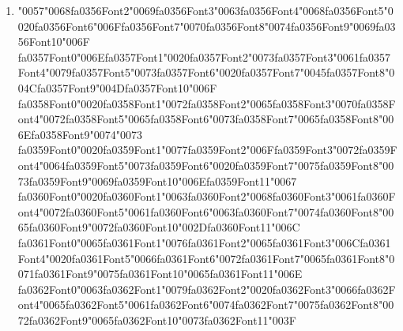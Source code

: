 \documentclass[12pt]{article}
\begin{document}
\begin{enumerate}[label=Q\arabic*.]
 \item {\char"0057}{\char"0068}{\csname fa0356Font2\endcsname\char"0069}{\csname fa0356Font3\endcsname\char"0063}{\csname fa0356Font4\endcsname\char"0068}{\csname fa0356Font5\endcsname\char"0020}{\csname fa0356Font6\endcsname\char"006F}{\csname fa0356Font7\endcsname\char"0070}{\csname fa0356Font8\endcsname\char"0074}{\csname fa0356Font9\endcsname\char"0069}{\csname fa0356Font10\endcsname\char"006F} {\csname fa0357Font0\endcsname\char"006E}{\csname fa0357Font1\endcsname\char"0020}{\csname fa0357Font2\endcsname\char"0073}{\csname fa0357Font3\endcsname\char"0061}{\csname fa0357Font4\endcsname\char"0079}{\csname fa0357Font5\endcsname\char"0073}{\csname fa0357Font6\endcsname\char"0020}{\csname fa0357Font7\endcsname\char"0045}{\csname fa0357Font8\endcsname\char"004C}{\csname fa0357Font9\endcsname\char"004D}{\csname fa0357Font10\endcsname\char"006F} {\csname fa0358Font0\endcsname\char"0020}{\csname fa0358Font1\endcsname\char"0072}{\csname fa0358Font2\endcsname\char"0065}{\csname fa0358Font3\endcsname\char"0070}{\csname fa0358Font4\endcsname\char"0072}{\csname fa0358Font5\endcsname\char"0065}{\csname fa0358Font6\endcsname\char"0073}{\csname fa0358Font7\endcsname\char"0065}{\csname fa0358Font8\endcsname\char"006E}{\csname fa0358Font9\endcsname\char"0074}{\char"0073} {\csname fa0359Font0\endcsname\char"0020}{\csname fa0359Font1\endcsname\char"0077}{\csname fa0359Font2\endcsname\char"006F}{\csname fa0359Font3\endcsname\char"0072}{\csname fa0359Font4\endcsname\char"0064}{\csname fa0359Font5\endcsname\char"0073}{\csname fa0359Font6\endcsname\char"0020}{\csname fa0359Font7\endcsname\char"0075}{\csname fa0359Font8\endcsname\char"0073}{\csname fa0359Font9\endcsname\char"0069}{\csname fa0359Font10\endcsname\char"006E}{\csname fa0359Font11\endcsname\char"0067} {\csname fa0360Font0\endcsname\char"0020}{\csname fa0360Font1\endcsname\char"0063}{\csname fa0360Font2\endcsname\char"0068}{\csname fa0360Font3\endcsname\char"0061}{\csname fa0360Font4\endcsname\char"0072}{\csname fa0360Font5\endcsname\char"0061}{\csname fa0360Font6\endcsname\char"0063}{\csname fa0360Font7\endcsname\char"0074}{\csname fa0360Font8\endcsname\char"0065}{\csname fa0360Font9\endcsname\char"0072}{\csname fa0360Font10\endcsname\char"002D}{\csname fa0360Font11\endcsname\char"006C} {\csname fa0361Font0\endcsname\char"0065}{\csname fa0361Font1\endcsname\char"0076}{\csname fa0361Font2\endcsname\char"0065}{\csname fa0361Font3\endcsname\char"006C}{\csname fa0361Font4\endcsname\char"0020}{\csname fa0361Font5\endcsname\char"0066}{\csname fa0361Font6\endcsname\char"0072}{\csname fa0361Font7\endcsname\char"0065}{\csname fa0361Font8\endcsname\char"0071}{\csname fa0361Font9\endcsname\char"0075}{\csname fa0361Font10\endcsname\char"0065}{\csname fa0361Font11\endcsname\char"006E} {\csname fa0362Font0\endcsname\char"0063}{\csname fa0362Font1\endcsname\char"0079}{\csname fa0362Font2\endcsname\char"0020}{\csname fa0362Font3\endcsname\char"0066}{\csname fa0362Font4\endcsname\char"0065}{\csname fa0362Font5\endcsname\char"0061}{\csname fa0362Font6\endcsname\char"0074}{\csname fa0362Font7\endcsname\char"0075}{\csname fa0362Font8\endcsname\char"0072}{\csname fa0362Font9\endcsname\char"0065}{\csname fa0362Font10\endcsname\char"0073}{\csname fa0362Font11\endcsname\char"003F}

\end{enumerate}
\end{document}
